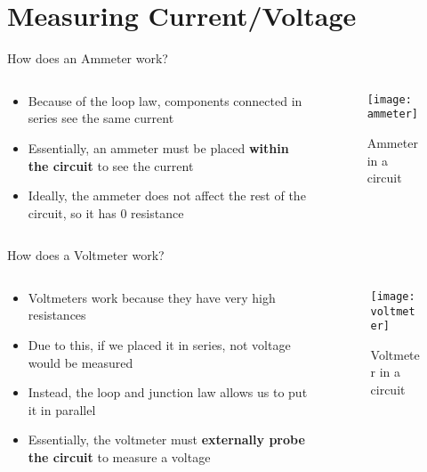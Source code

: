 \documentclass{beamer}
\theoremstyle{remark}
\begin{document}
\section{Measuring Current/Voltage}
\begin{frame}{How does an Ammeter work?}
  \begin{columns}
    \begin{column}{0.5\textwidth}
      \begin{itemize}
      \item Because of the loop law, components connected in series see the same current
      \item Essentially, an ammeter must be placed \textbf{within the circuit} to see the current
      \item Ideally, the ammeter does not affect the rest of the circuit, so it has $0$ resistance
      \end{itemize}
    \end{column}
    \begin{column}{0.5\textwidth}
      \begin{figure}[H]
        \centering
        \texttt{[image: ammeter]}
        \caption{Ammeter in a circuit}
      \end{figure}
    \end{column}
  \end{columns}
\end{frame}

\begin{frame}{How does a Voltmeter work?}
  \begin{columns}
    \begin{column}{0.6\textwidth}
      \begin{itemize}
      \item Voltmeters work because they have very high resistances
      \item Due to this, if we placed it in series, not voltage would be measured
      \item Instead, the loop and junction law allows us to put it in parallel
      \item Essentially, the voltmeter must \textbf{externally probe the circuit} to measure a voltage
      \end{itemize}
    \end{column}
    \begin{column}{0.4\textwidth}
      \begin{figure}[H]
        \centering
        \texttt{[image: voltmeter]}
        \caption{Voltmeter in a circuit}
      \end{figure}
    \end{column}
  \end{columns}
\end{frame}
\end{document}
